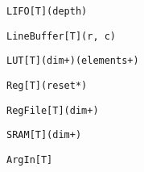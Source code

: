 \begin{table*}
\newsavebox{\filoSyntax}
\begin{lrbox}{\filoSyntax}
\begin{lstlisting}[language=SpatialTable]
LIFO[T](depth)
\end{lstlisting}
\end{lrbox}

\newsavebox{\lineBufferSyntax}
\begin{lrbox}{\lineBufferSyntax}
\begin{lstlisting}[language=SpatialTable]
LineBuffer[T](r, c)
\end{lstlisting}
\end{lrbox}

\newsavebox{\lutSyntax}
\begin{lrbox}{\lutSyntax}
\begin{lstlisting}[language=SpatialTable]
LUT[T](dim+)(elements+)
\end{lstlisting}
\end{lrbox}

\newsavebox{\regSyntax}
\begin{lrbox}{\regSyntax}
\begin{lstlisting}[language=SpatialTable]
Reg[T](reset*)
\end{lstlisting}
\end{lrbox}

\newsavebox{\regfileSyntax}
\begin{lrbox}{\regfileSyntax}
\begin{lstlisting}[language=SpatialTable]
RegFile[T](dim+)
\end{lstlisting}
\end{lrbox}

\newsavebox{\sramSyntax}
\begin{lrbox}{\sramSyntax}
\begin{lstlisting}[language=SpatialTable]
SRAM[T](dim+)
\end{lstlisting}
\end{lrbox}

\newsavebox{\argInSyntax}
\begin{lrbox}{\argInSyntax}
\begin{lstlisting}[language=SpatialTable]
ArgIn[T]
\end{lstlisting}
\end{lrbox}


\end{table*}
